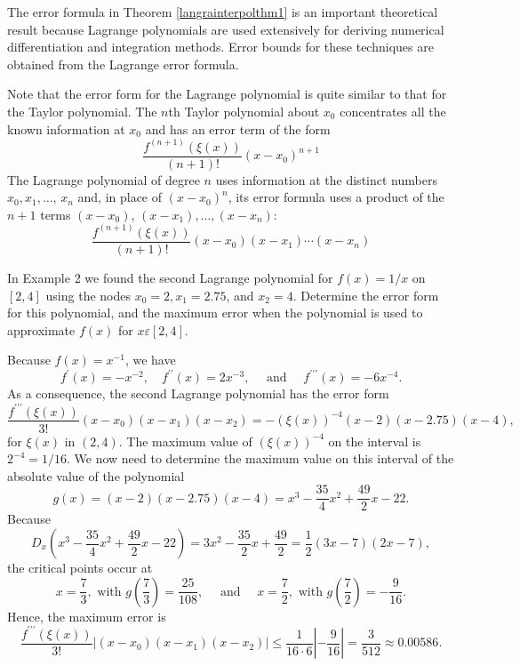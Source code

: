 The error formula in Theorem \ref{langrainterpolthm1} is an important theoretical result because Lagrange polynomials are used extensively for deriving numerical differentiation and integration methods. Error bounds for these techniques are obtained from the Lagrange error formula.

Note that the error form for the Lagrange polynomial is quite similar to that for the Taylor polynomial. The $n$th Taylor polynomial about $x_{0}$ concentrates all the known information at $x_{0}$ and has an error term of the form
\[\frac{f^{(n+1)}(\xi(x))}{(n+1)!}\left(x-x_{0}\right)^{n+1}\]
The Lagrange polynomial of degree $n$ uses information at the distinct numbers $x_{0}, x_{1}, \ldots$, $x_{n}$ and, in place of $\left(x-x_{0}\right)^{n}$, its error formula uses a product of the $n+1$ terms $\left(x-x_{0}\right)$, $\left(x-x_{1}\right), \ldots,\left(x-x_{n}\right):$
\[\frac{f^{(n+1)}(\xi(x))}{(n+1)!}\left(x-x_{0}\right)\left(x-x_{1}\right) \cdots\left(x-x_{n}\right)\]

\begin{example}In Example 2 we found the second Lagrange polynomial for $f(x)=1 / x$ on $[2,4]$ using the nodes $x_{0}=2, x_{1}=2.75$, and $x_{2}=4$. Determine the error form for this polynomial, and the maximum error when the polynomial is used to approximate $f(x)$ for $x \varepsilon[2,4]$.
\end{example}

\begin{mysolution}
Because $f(x)=x^{-1}$, we have
\[f^{\prime}(x)=-x^{-2}, \quad f^{\prime \prime}(x)=2 x^{-3}, \quad \text { and } \quad f^{\prime \prime \prime}(x)=-6 x^{-4}.\]
As a consequence, the second Lagrange polynomial has the error form\\
\[\frac{f^{\prime \prime \prime}(\xi(x))}{3!}\left(x-x_{0}\right)\left(x-x_{1}\right)\left(x-x_{2}\right)=-(\xi(x))^{-4}(x-2)(x-2.75)(x-4),\]
for $\xi(x)$ in $(2,4)$. The maximum value of $(\xi(x))^{-4}$ on the interval is $2^{-4}=1 / 16$. We now need to determine the maximum value on this interval of the absolute value of the polynomial
\[g(x)=(x-2)(x-2.75)(x-4)=x^{3}-\frac{35}{4} x^{2}+\frac{49}{2} x-22 .\]
Because
\[D_{x}\left(x^{3}-\frac{35}{4} x^{2}+\frac{49}{2} x-22\right)=3 x^{2}-\frac{35}{2} x+\frac{49}{2}=\frac{1}{2}(3 x-7)(2 x-7),\]
the critical points occur at
\[x=\frac{7}{3}, \text { with } g\left(\frac{7}{3}\right)=\frac{25}{108}, \quad \text { and } \quad x=\frac{7}{2}, \text { with } g\left(\frac{7}{2}\right)=-\frac{9}{16}.\]
Hence, the maximum error is
\[\frac{f^{\prime \prime \prime}(\xi(x))}{3!}\left|\left(x-x_{0}\right)\left(x-x_{1}\right)\left(x-x_{2}\right)\right| \leq \frac{1}{16 \cdot 6}\left|-\frac{9}{16}\right|=\frac{3}{512} \approx 0.00586.\]
\end{mysolution}

